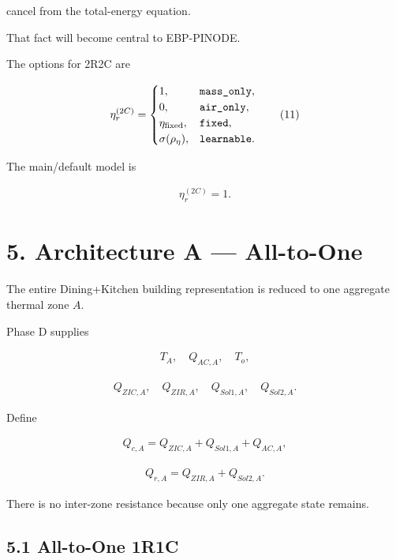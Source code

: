 \documentclass[11pt]{article}
\begin{document}
cancel from the total-energy equation.

That fact will become central to EBP-PINODE.

The options for 2R2C are

\begin{align}
\eta_r^{(2C)}=
\begin{cases}
1, & \texttt{mass\_only},\\
0, & \texttt{air\_only},\\
\eta_{\rm fixed}, & \texttt{fixed},\\
\sigma(\rho_\eta), & \texttt{learnable}.
\end{cases}
\tag{11}
\end{align}

The main/default model is

\begin{align}
\boxed{\eta_r^{(2C)}=1.}
\end{align}

\section*{5. Architecture A --- All-to-One}

The entire Dining+Kitchen building representation is reduced to one aggregate thermal zone \(A\).

Phase D supplies

\begin{align}
T_A,
\quad
Q_{AC,A},
\quad
T_o,
\end{align}

\begin{align}
Q_{ZIC,A},
\quad
Q_{ZIR,A},
\quad
Q_{Sol1,A},
\quad
Q_{Sol2,A}.
\end{align}

Define

\begin{align}
Q_{c,A}
=
Q_{ZIC,A}+Q_{Sol1,A}+Q_{AC,A},
\tag{12}
\end{align}

\begin{align}
Q_{r,A}
=
Q_{ZIR,A}+Q_{Sol2,A}.
\tag{13}
\end{align}

There is no inter-zone resistance because only one aggregate state remains.

\subsection*{5.1 All-to-One 1R1C}
\end{document}
